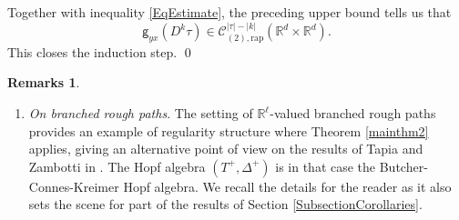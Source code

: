 \documentclass[10pt]{amsart}
\theoremstyle{plain}
\theoremstyle{definition}
\newtheorem*{remarks*} {Remarks}
\newcommand{\rap}{\mathrm{rap}}
\newcommand{\sfg}{\mathsf{g}}
\newcommand{\bbR}{\mathbb{R}}
\newcommand{\mcC}{\mathcal{C}}
\begin{document}
Together with inequality \eqref{EqEstimate}, the preceding upper bound tells us that\vspace*{-3pt}
\[
{\sfg}_{yx}(D^k\tau)\in\mcC^{|\tau|-|k|}_{(2),\rap}(\bbR^d\times\bbR^d).
\]
This closes the induction step. \qed

\skpt
\begin{remarks*}
\begin{enumerate}
\item
\emph{On branched rough paths}. The setting of $\bbR^\ell$-valued branched rough paths provides an example of regularity structure where Theorem \ref{mainthm2} applies, giving an alternative point of view on the results of Tapia and Zambotti in \cite{TZ18}. The Hopf algebra $(T^+,\Delta^+)$ is in that case the Butcher-Connes-Kreimer Hopf algebra. We recall the details for the reader as it also sets the scene for part of the results of Section \ref{SubsectionCorollaries}.


\end{enumerate}
\end{remarks*}
\end{document}
